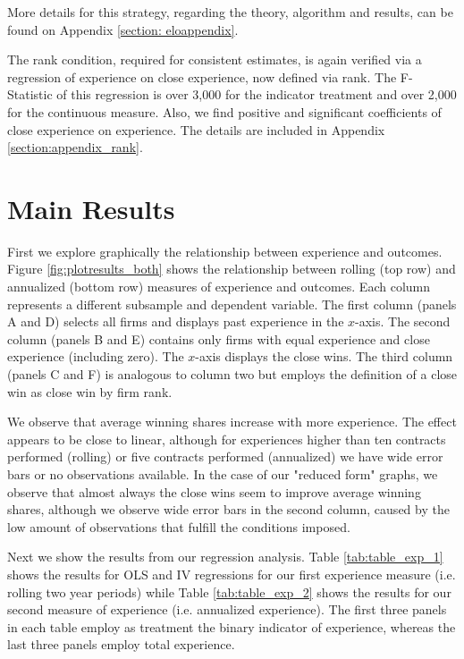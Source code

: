 More details for this strategy, regarding the theory, algorithm and results, can be found on Appendix \ref{section: eloappendix}.

The rank condition, required for consistent estimates, is again verified via a regression of experience on close experience, now defined via rank. The F-Statistic of this regression is over 3,000 for the indicator treatment and over 2,000 for the continuous measure. Also, we find positive and significant coefficients of close experience on experience. The details are included in Appendix \ref{section:appendix_rank}.

\section{Main Results}
\label{section:main_results}
First we explore graphically the relationship between experience and outcomes. Figure \ref{fig:plotresults_both} shows the relationship between rolling (top row) and annualized (bottom row) measures of experience and outcomes.  Each column represents a different subsample and dependent variable. The first column (panels A and D) selects all firms and displays past experience in the $x$-axis. The second column (panels B and E) contains only firms with equal experience and close experience (including zero). The $x$-axis displays the close wins. The third column (panels C and F) is analogous to column two but employs the definition of a close win as close win by firm rank.

We observe that average winning shares increase with more experience. The effect appears to be close to linear, although for experiences higher than ten contracts performed (rolling) or five contracts performed (annualized) we have wide error bars or no observations available. In the case of our "reduced form" graphs, we observe that almost always the close wins seem to improve average winning shares, although we observe wide error bars in the second column, caused by the low amount of observations that fulfill the conditions imposed.

Next we show the results from our regression analysis. Table \ref{tab:table_exp_1} shows the results for OLS and IV regressions for our first experience measure (i.e. rolling two year periods) while Table \ref{tab:table_exp_2} shows the results for our second measure of experience (i.e. annualized experience). The first three panels in each table employ as treatment the binary indicator of experience, whereas the last three panels employ total experience.

